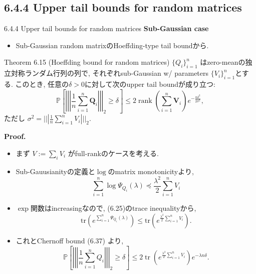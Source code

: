 \documentclass[unicode,aspectratio=169,11pt]{beamer}
\newcommand{\trace}{\mathrm{tr}}
\begin{document}
\subsection{6.4.4 Upper tail bounds for random matrices}
\begin{frame}{6.4.4 Upper tail bounds for random matrices}{}
{\bf Sub-Gaussian case}
\begin{itemize}
  \item Sub-Gaussian random matrixのHoeffding-type tail boundから.
\end{itemize} 
\begin{block}{Theorem 6.15 (Hoeffding bound for random matrices)}
  $\{Q_i\}_{i=1}^n$ はzero-meanの独立対称ランダム行列の列で, それぞれsub-Gaussian w/ parameters $\{V_i\}_{i=1}^n$とする.
  このとき, 任意の$\delta > 0$に対して次のupper tail boundが成り立つ:
  \[
    \mathbb{P}\left[\left|\left|\left|\frac{1}{n} \sum_{i=1}^{n} \mathbf{Q}_{i}\right|\right|\right|_{2} \geq \delta\right]
    \leq 2 \operatorname{rank}\left(\sum_{i=1}^{n} \mathbf{V}_{i}\right) e^{-\frac{n \delta^{2}}{2 \sigma^{2}}},
    \tag{6.38}
  \]
  ただし $\sigma^2 = ||| \frac{1}{n} \sum_{i=1}^n V_i |||_2$.
\end{block}
\end{frame}

\begin{frame}{}{}
  {\bf Proof.}
  \begin{itemize}
    \item まず $V := \sum_i V_i$ がfull-rankのケースを考える.
    \item Sub-Gauusianityの定義と$\log$のmatrix monotonicityより,
          \[
            \sum_{i = 1}^n \log \Psi_{Q_i}(\lambda)
            \preceq \frac{\lambda^2}{2} \sum_{i=1}^n V_i
          \]
    \item $\exp$関数はincreasingなので, (6.25)のtrace inequalityから,
          \[
            \trace\left(e^{\sum_{i=1}^n\Psi_{Q_i}(\lambda)}\right)
            \le \trace\left(e^{\frac{\lambda^2}{2}\sum_{i=1}^nV_i}\right).
          \]
    \item これとChernoff bound (6.37) より, 
          \[
            \mathbb{P}\left[\left|\left|\left|\frac{1}{n} \sum_{i=1}^{n} Q_{i}\right|\right|\right|_{2} \geq \delta\right]
            \leq 2 \operatorname{tr}\left(e^{\frac{\lambda^{2}}{2} \sum_{i=1}^{n} V_{i}}\right) e^{-\lambda n \delta}.
          \]
  \end{itemize}
\end{frame}
\end{document}
